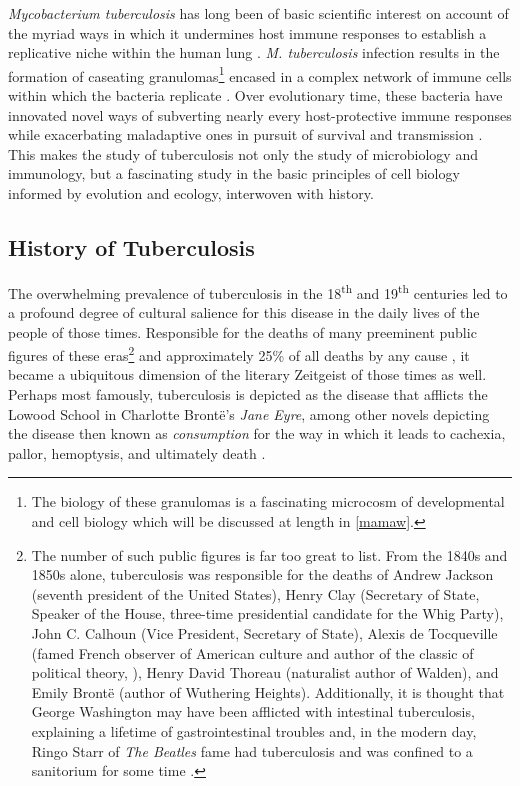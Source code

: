 \textit{Mycobacterium tuberculosis} has long been of basic scientific interest on account of the myriad ways in which it undermines host immune responses to establish a replicative niche within the human lung \citep{Baxt2013, Yu2019, Nguyen2009, Stanley2003, Monack2004, Hmama2015}. \textit{M. tuberculosis} infection results in the formation of caseating granulomas\footnote{The biology of these granulomas is a fascinating microcosm of developmental and cell biology which will be discussed at length in \autoref{mamaw}.} encased in a complex network of immune cells within which the bacteria replicate \citep{Pagan2018}. Over evolutionary time, these bacteria have innovated novel ways of subverting nearly every host\hyp{}protective immune responses while exacerbating maladaptive ones in pursuit of survival and transmission \citep{Ernst2012, Rahman2020, Chandra2022, Guan2021}. This makes the study of tuberculosis not only the study of microbiology and immunology, but a fascinating study in the basic principles of cell biology informed by evolution and ecology, interwoven with history. 

\subsection{History of Tuberculosis}\label{tbhistory}

The overwhelming prevalence of tuberculosis in the 18\textsuperscript{th} and 19\textsuperscript{th} centuries led to a profound degree of cultural salience for this disease in the daily lives of the people of those times. Responsible for the deaths of many preeminent public figures of these eras\footnote{The number of such public figures is far too great to list. From the 1840s and 1850s alone, tuberculosis was responsible for the deaths of Andrew Jackson (seventh president of the United States), Henry Clay (Secretary of State, Speaker of the House, three\hyp{}time presidential candidate for the Whig Party), John C. Calhoun (Vice President, Secretary of State), Alexis de Tocqueville (famed French observer of American culture and author of the classic of political theory, ), Henry David Thoreau (naturalist author of Walden), and Emily Bront\"{e} (author of Wuthering Heights). Additionally, it is thought that George Washington may have been afflicted with intestinal tuberculosis, explaining a lifetime of gastrointestinal troubles \citep{Chernow2010} and, in the modern day, Ringo Starr of \textit{The Beatles} fame had tuberculosis and was confined to a sanitorium for some time \citep{Starr2016}.} and approximately 25\% of all deaths by any cause \citep{CDC2016}, it became a ubiquitous dimension of the literary Zeitgeist of those times as well. Perhaps most famously, tuberculosis is depicted as the disease that afflicts the Lowood School in Charlotte Bront\"{e}'s \textit{Jane Eyre}, among other novels depicting the disease then known as \textit{consumption} for the way in which it leads to cachexia, pallor, hemoptysis, and ultimately death \citep{Bronte1847, Loddenkemper2015}.

